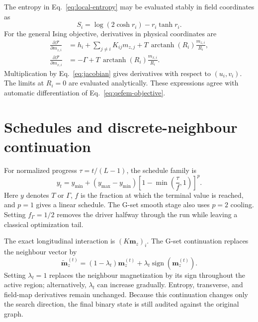 \documentclass[
  aps,
  prx,
  reprint,
  amsmath,
  amssymb,
  groupedaddress,
  nofootinbib,
  floatfix,
  longbibliography
]{revtex4-2}
\newcommand{\sign}{\operatorname{sign}}
\begin{document}
The entropy in Eq.~\eqref{eq:local-entropy} may be evaluated stably in field
coordinates as
\begin{equation}
 S_i=\log(2\cosh r_i)-r_i\tanh r_i.
 \label{eq:entropy-field}
\end{equation}
For the general Ising objective, derivatives in physical coordinates are
\begin{align}
 \frac{\partial\mathcal F}{\partial m_{z,i}}
 &=h_i+\sum_{j\ne i}K_{ij}m_{z,j}
   +T\,\operatorname{arctanh}(R_i)\frac{m_{z,i}}{R_i},\\
 \frac{\partial\mathcal F}{\partial m_{x,i}}
 &=-\Gamma
   +T\,\operatorname{arctanh}(R_i)\frac{m_{x,i}}{R_i}.
 \label{eq:physical-gradient}
\end{align}
Multiplication by Eq.~\eqref{eq:jacobian} gives derivatives with respect to
$(u_i,v_i)$.  The limits at $R_i=0$ are evaluated analytically.  These
expressions agree with automatic differentiation of
Eq.~\eqref{eq:qefem-objective}.

\section{Schedules and discrete-neighbour continuation}
\label{app:schedules}

For normalized progress $\tau=t/(L-1)$, the schedule family is
\begin{equation}
 y_t=y_{\min}+(y_{\max}-y_{\min})
 \left[1-\min\!\left(\frac{\tau}{f},1\right)\right]^p.
 \label{eq:schedule}
\end{equation}
Here $y$ denotes $T$ or $\Gamma$, $f$ is the fraction at which the terminal
value is reached, and $p=1$ gives a linear schedule.  The G-set smooth stage
also uses $p=2$ cooling.  Setting $f_{\Gamma}=1/2$ removes the driver halfway
through the run while leaving a classical optimization tail.

The exact longitudinal interaction is $(K\bm m_z)_i$.  The G-set continuation
replaces the neighbour vector by
\begin{equation}
 \widetilde{\bm m}_z^{(t)}
 =(1-\lambda_t)\bm m_z^{(t)}
 +\lambda_t\sign(\bm m_z^{(t)}).
 \label{eq:discrete-neighbour}
\end{equation}
Setting $\lambda_t=1$ replaces the neighbour magnetization by its sign
throughout the active region; alternatively, $\lambda_t$ can increase
gradually.  Entropy, transverse, and field-map derivatives remain
unchanged.  Because this continuation changes only the search direction, the
final binary state is still audited against the original graph.
\end{document}
